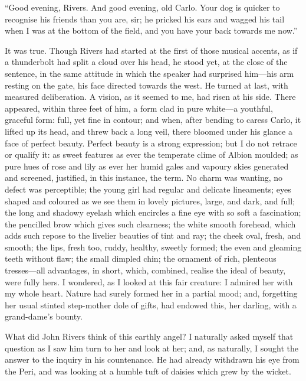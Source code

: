 \enquote{Good evening, \Mr{} Rivers. And good evening, old Carlo. Your
dog is quicker to recognise his friends than you are, sir; he pricked
his ears and wagged his tail when I was at the bottom of the field, and
you have your back towards me now.}

It was true. Though \Mr{} Rivers had started at the first of those
musical accents, as if a thunderbolt had split a cloud over his head, he
stood yet, at the close of the sentence, in the same attitude in which
the speaker had surprised him---his arm resting on the gate, his face
directed towards the west. He turned at last, with measured
deliberation. A vision, as it seemed to me, had risen at his side. 
There appeared, within three feet of him, a form clad in pure white---a
youthful, graceful form: full, yet fine in contour; and when, after
bending to caress Carlo, it lifted up its head, and threw back a long
veil, there bloomed under his glance a face of perfect beauty. Perfect
beauty is a strong expression; but I do not retrace or qualify it: as
sweet features as ever the temperate clime of Albion moulded; as pure
hues of rose and lily as ever her humid gales and vapoury skies
generated and screened, justified, in this instance, the term. No charm
was wanting, no defect was perceptible; the young girl had regular and
delicate lineaments; eyes shaped and coloured as we see them in lovely
pictures, large, and dark, and full; the long and shadowy eyelash which
encircles a fine eye with so soft a fascination; the pencilled brow
which gives such clearness; the white smooth forehead, which adds such
repose to the livelier beauties of tint and ray; the cheek oval, fresh,
and smooth; the lips, fresh too, ruddy, healthy, sweetly formed; the
even and gleaming teeth without flaw; the small dimpled chin; the
ornament of rich, plenteous tresses---all advantages, in short, which,
combined, realise the ideal of beauty, were fully hers. I wondered, as
I looked at this fair creature: I admired her with my whole heart. 
Nature had surely formed her in a partial mood; and, forgetting her
usual stinted step-mother dole of gifts, had endowed this, her darling,
with a grand-dame's bounty.

What did \St{} John Rivers think of this earthly angel? I naturally asked
myself that question as I saw him turn to her and look at her; and, as
naturally, I sought the answer to the inquiry in his countenance. He
had already withdrawn his eye from the Peri, and was looking at a humble
tuft of daisies which grew by the wicket.

